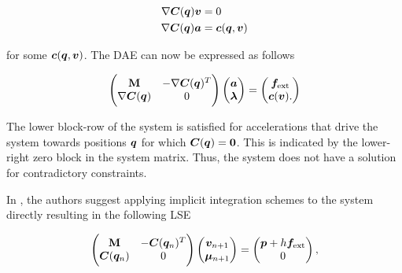 \begin{align*}
    \nabla \bm{C}(\bm{q})\bm{v} &= 0 \\
    \nabla \bm{C}(\bm{q})\bm{a} &= \bm{c}(\bm{q}, \bm{v})
\end{align*}

\noindent for some $\bm{c}(\bm{q}, \bm{v})$. The DAE can now be expressed as follows \cite{ascher1995}

\begin{equation}\label{eq:hard-constraints}
    \begin{pmatrix}
        \mathbf{M} & -\nabla \bm{C}(\bm{q})^T \\
        \nabla \bm{C}(\bm{q}) & 0
    \end{pmatrix}
    \begin{pmatrix}
        \bm{a} \\
        \bm{\lambda}
    \end{pmatrix}
    =
    \begin{pmatrix}
        \bm{f_\text{ext}} \\
        \bm{c}(\bm{v}).
    \end{pmatrix}
\end{equation}

\noindent The lower block-row of the system is satisfied for accelerations that drive the system towards positions $\bm{q}$ for which 
$\bm{C}(\bm{q}) = \bm{0}$. This is indicated by the lower-right zero block in the system matrix. Thus, the system does not have a 
solution for contradictory constraints. 

In \cite{tournier2015}, the authors suggest applying implicit integration schemes to the system directly resulting in the following LSE

\begin{equation}\label{eq:hard-constraints-lse}
\begin{pmatrix}
    \mathbf{M} & -\bm{C}(\bm{q}_n)^T \\
    \bm{C}(\bm{q}_n) & 0
\end{pmatrix}
\begin{pmatrix}
    \bm{v}_{n+1} \\
    \bm{\mu}_{n+1}
\end{pmatrix}
=
\begin{pmatrix}
    \bm{p} + h\bm{f_\text{ext}} \\
    0
\end{pmatrix},
\end{equation}

